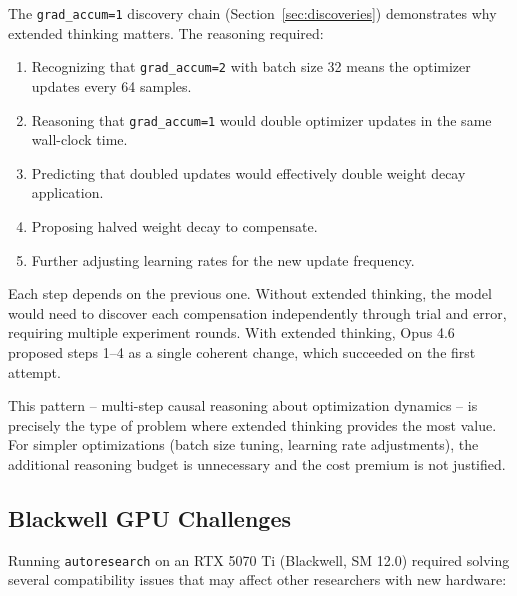 \documentclass[11pt]{article}
\begin{document}
The \texttt{grad\_accum=1} discovery chain (Section~\ref{sec:discoveries}) demonstrates why extended thinking matters. The reasoning required:

\begin{enumerate}[leftmargin=*]
    \item Recognizing that \texttt{grad\_accum=2} with batch size 32 means the optimizer updates every 64 samples.
    \item Reasoning that \texttt{grad\_accum=1} would double optimizer updates in the same wall-clock time.
    \item Predicting that doubled updates would effectively double weight decay application.
    \item Proposing halved weight decay to compensate.
    \item Further adjusting learning rates for the new update frequency.
\end{enumerate}

Each step depends on the previous one. Without extended thinking, the model would need to discover each compensation independently through trial and error, requiring multiple experiment rounds. With extended thinking, Opus 4.6 proposed steps 1--4 as a single coherent change, which succeeded on the first attempt.

This pattern -- multi-step causal reasoning about optimization dynamics -- is precisely the type of problem where extended thinking provides the most value. For simpler optimizations (batch size tuning, learning rate adjustments), the additional reasoning budget is unnecessary and the cost premium is not justified.

\subsection{Blackwell GPU Challenges}
\label{sec:blackwell}

Running \texttt{autoresearch} on an RTX 5070 Ti (Blackwell, SM 12.0) required solving several compatibility issues that may affect other researchers with new hardware:
\end{document}
